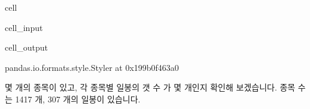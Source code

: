 \documentclass[letterpaper,10pt,english]{jupyterBook}
\begin{document}
\begin{sphinxuseclass}{cell}\begin{sphinxVerbatimInput}

\begin{sphinxuseclass}{cell_input}
\begin{sphinxVerbatim}[commandchars=\\\{\}]
  
\end{sphinxVerbatim}

\end{sphinxuseclass}\end{sphinxVerbatimInput}
\begin{sphinxVerbatimOutput}

\begin{sphinxuseclass}{cell_output}
\begin{sphinxVerbatim}[commandchars=\\\{\}]
\PYGZlt{}pandas.io.formats.style.Styler at 0x199b0f463a0\PYGZgt{}
\end{sphinxVerbatim}

\end{sphinxuseclass}\end{sphinxVerbatimOutput}

\end{sphinxuseclass}
\sphinxAtStartPar
 몇 개의 종목이 있고, 각 종목별 일봉의 갯 수 가 몇 개인지 확인해 보겠습니다. 종목 수는 1417 개, 307 개의 일봉이 있습니다.
\end{document}
